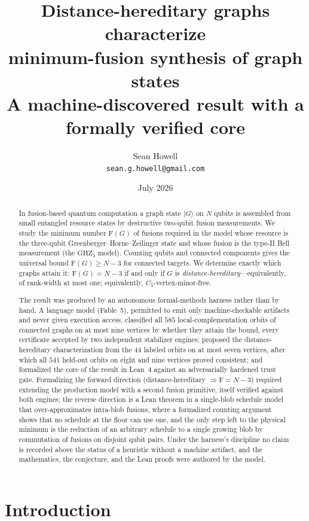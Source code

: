 \documentclass[11pt]{article}
\title{\bf Distance-hereditary graphs characterize\\ minimum-fusion synthesis of graph states\\[4pt]
\large A machine-discovered result with a formally verified core}
\author{Sean Howell\\[2pt]
\small \texttt{sean.g.howell@gmail.com}}
\date{July 2026}
\theoremstyle{definition}
\theoremstyle{remark}
\newcommand{\F}{\mathrm{F}}
\newcommand{\GHZ}{\mathrm{GHZ}_3}
\newcommand{\N}{N}
\begin{document}
\maketitle

\begin{abstract}
In fusion-based quantum computation a graph state $|G\rangle$ on $\N$ qubits is assembled from
small entangled resource states by destructive two-qubit fusion measurements. We study the
minimum number $\F(G)$ of fusions required in the model whose resource is the three-qubit
Greenberger--Horne--Zeilinger state and whose fusion is the type-II Bell measurement (the
$\GHZ$ model). Counting qubits and connected components gives the universal bound
$\F(G)\ge \N-3$ for connected targets. We determine exactly which graphs attain it:
$\F(G)=\N-3$ if and only if $G$ is \emph{distance-hereditary}---equivalently, of rank-width at
most one; equivalently, $C_5$-vertex-minor-free.

The result was produced by an autonomous formal-methods harness rather than by hand. A language
model (Fable~5), permitted to emit only machine-checkable artifacts and never given execution
access, classified all $585$ local-complementation orbits of connected graphs on at most nine
vertices by whether they attain the bound, every certificate accepted by two independent
stabilizer engines; proposed the distance-hereditary characterization from the $44$ labeled
orbits on at most seven vertices, after which all $541$ held-out orbits on eight and nine
vertices proved consistent; and formalized the core of the result in Lean~4 against an
adversarially hardened trust gate. Formalizing the forward direction
(distance-hereditary $\Rightarrow \F=\N-3$) required extending the production model with a second
fusion primitive, itself verified against both engines; the reverse direction is a Lean theorem in
a single-blob schedule model that over-approximates intra-blob fusions, where a formalized counting
argument shows that no schedule at the floor can use one, and the only step left to the physical
minimum is the reduction of an arbitrary schedule to a single growing blob by commutation of
fusions on disjoint qubit pairs. Under the harness's discipline no claim is recorded above the
status of a heuristic without a machine artifact, and the mathematics, the conjecture, and the
Lean proofs were authored by the model.
\end{abstract}

\section{Introduction}
\end{document}
